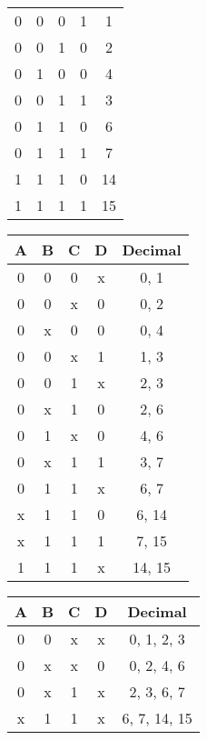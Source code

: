 \documentclass{article}
\begin{document}
\begin{resolution}
\begin{table}[H]
\begin{tabular}{cccc c}
                        0&0&0&1& 1\\
                        0&0&1&0& 2\\
                        0&1&0&0& 4\\\hline
                        0&0&1&1& 3\\
                        0&1&1&0& 6\\\hline
                        0&1&1&1& 7\\
                        1&1&1&0& 14\\\hline
                        1&1&1&1& 15\\\hline
                    \end{tabular}
                    \quad
                    \centering\begin{tabular}{cccc c}
                        A&B&C&D& Decimal\\\hline
                        0&0&0&x& 0, 1\\
                        0&0&x&0& 0, 2\\
                        0&x&0&0& 0, 4\\\hline
                        0&0&x&1& 1, 3\\
                        0&0&1&x& 2, 3\\
                        0&x&1&0& 2, 6\\
                        0&1&x&0& 4, 6\\\hline
                        0&x&1&1& 3, 7\\
                        0&1&1&x& 6, 7\\
                        x&1&1&0& 6, 14\\\hline
                        x&1&1&1& 7, 15\\
                        1&1&1&x& 14, 15\\\hline
                    \end{tabular}
                    \quad
                    \centering\begin{tabular}{cccc c}
                        A&B&C&D& Decimal\\\hline
                        0&0&x&x& 0, 1, 2, 3\\
                        0&x&x&0& 0, 2, 4, 6\\\hline
                        0&x&1&x& 2, 3, 6, 7\\\hline
                        x&1&1&x& 6, 7, 14, 15\\\hline
                    \end{tabular}

\end{table}
\end{resolution}
\end{document}
